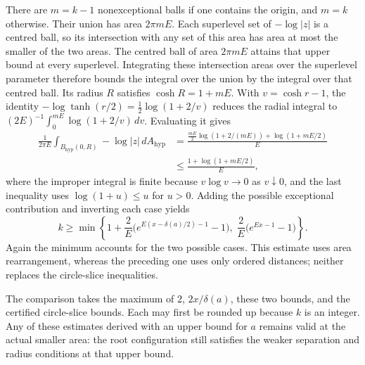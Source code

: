 \documentclass[11pt]{article}
\begin{document}
There are $m=k-1$ nonexceptional balls if one contains the origin, and
$m=k$ otherwise. Their union has area $2\pi mE$. Each superlevel set of
$-\log|z|$ is a centred ball, so its intersection with any set of this
area has area at most the smaller of the two areas. The centred ball
of area $2\pi mE$ attains that upper bound at every superlevel.
Integrating these intersection areas over the superlevel parameter
therefore bounds the integral over the union by the integral over that
centred ball. Its radius $R$ satisfies $\cosh R=1+mE$.
With $v=\cosh r-1$, the identity
$-\log\tanh(r/2)=\tfrac12\log(1+2/v)$ reduces the radial integral to
$(2E)^{-1}\int_0^{mE}\log(1+2/v)\,dv$. Evaluating it gives
\begin{align*}
 \frac1{2\pi E}\int_{B_{\mathrm{hyp}}(0,R)}-\log|z|\,dA_{\mathrm{hyp}}
 &=\frac{\frac{mE}{2}\log(1+2/(mE))+\log(1+mE/2)}{E}\\
 &\le\frac{1+\log(1+mE/2)}{E},
\end{align*}
where the improper integral is finite because $v\log v\to0$ as
$v\downarrow0$, and the last inequality uses $\log(1+u)\le u$ for $u>0$.
Adding the possible exceptional contribution and inverting each case yields
\[
 k\ge\min\left\{
  1+\frac2E\bigl(e^{E(x-\delta(a)/2)-1}-1\bigr),\;
  \frac2E\bigl(e^{Ex-1}-1\bigr)\right\}.
\]
Again the minimum accounts for the two possible cases. This estimate uses
area rearrangement, whereas the preceding one uses only ordered distances;
neither replaces the circle-slice inequalities.

The comparison takes the maximum of $2$, $2x/\delta(a)$, these two bounds,
and the certified circle-slice bounds. Each may first be rounded up because
$k$ is an integer. Any of these estimates derived with an upper bound for
$a$ remains valid at the actual smaller area: the root configuration still
satisfies the weaker separation and radius conditions at that upper bound.
\end{document}
